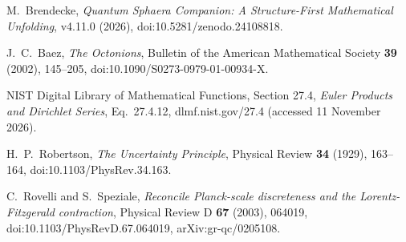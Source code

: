 M.~Brendecke, \emph{Quantum Sphaera Companion: A Structure-First Mathematical
Unfolding}, v4.11.0 (2026), doi:10.5281/zenodo.24108818.

J.~C.~Baez, \emph{The Octonions}, Bulletin of the American Mathematical
Society \textbf{39} (2002), 145--205,
doi:10.1090/S0273-0979-01-00934-X.

NIST Digital Library of Mathematical Functions, Section 27.4,
\emph{Euler Products and Dirichlet Series}, Eq.~27.4.12,
dlmf.nist.gov/27.4 (accessed 11 November 2026).

H.~P.~Robertson, \emph{The Uncertainty Principle}, Physical Review
\textbf{34} (1929), 163--164, doi:10.1103/PhysRev.34.163.

C.~Rovelli and S.~Speziale, \emph{Reconcile Planck-scale discreteness and
the Lorentz-Fitzgerald contraction}, Physical Review D \textbf{67} (2003),
064019, doi:10.1103/PhysRevD.67.064019, arXiv:gr-qc/0205108.
